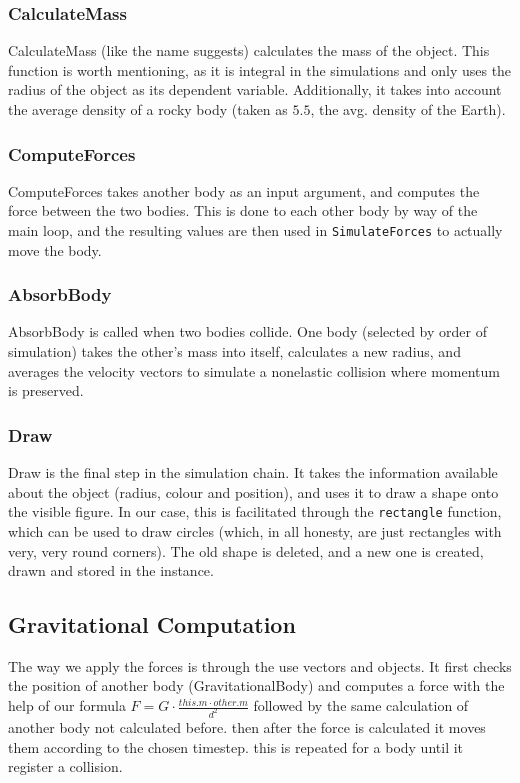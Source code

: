 \documentclass[11pt]{article}
\begin{document}
\subsubsection{CalculateMass}
CalculateMass (like the name suggests) calculates the mass of the object. This function is worth mentioning, as it is integral in the simulations and only uses the radius of the object as its dependent variable. Additionally, it takes into account the average density of a rocky body (taken as $5.5$, the avg. density of the Earth).
\subsubsection{ComputeForces}
ComputeForces takes another body as an input argument, and computes the force between the two bodies. This is done to each other body by way of the main loop, and the resulting values are then used in \verb|SimulateForces| to actually move the body.
\subsubsection{AbsorbBody}
AbsorbBody is called when two bodies collide. One body (selected by order of simulation) takes the other's mass into itself, calculates a new radius, and averages the velocity vectors to simulate a nonelastic collision where momentum is preserved.
\subsubsection{Draw}
Draw is the final step in the simulation chain. It takes the information available about the object (radius, colour and position), and uses it to draw a shape onto the visible figure. In our case, this is facilitated through the \verb|rectangle| function, which can be used to draw circles (which, in all honesty, are just rectangles with very, very round corners). The old shape is deleted, and a new one is created, drawn and stored in the instance.

\subsection{Gravitational Computation}\label{gravityComputeInfo}

The way we apply the forces is through the use vectors and objects. It first checks the position of another body (GravitationalBody) and computes a force with the help of our formula $F = G \cdot \frac{this.m \cdot other.m}{d^{2}}$ followed by the same calculation of another body not calculated before. then after the force is calculated it moves them according to the chosen timestep. this is repeated for a body until it register a collision.
\end{document}
